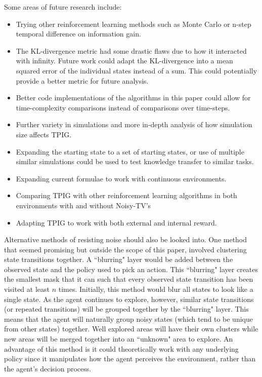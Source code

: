 \documentclass[12pt]{thesis}
\begin{document}
Some areas of future research include:
\begin{itemize}
	\item Trying other reinforcement learning methods such as Monte Carlo or n-step temporal difference on information gain.
	\item The KL-divergence metric had some drastic flaws due to how it interacted with infinity. Future work could adapt the KL-divergence into a mean squared error of the individual states instead of a sum. This could potentially provide a better metric for future analysis.
	\item Better code implementations of the algorithms in this paper could allow for time-complexity comparisons instead of comparisons over time-steps.
	\item Further variety in simulations and more in-depth analysis of how simulation size affects TPIG.
	\item Expanding the starting state to a set of starting states, or use of multiple similar simulations could be used to test knowledge transfer to similar tasks.
	\item Expanding current formulae to work with continuous environments.
	\item Comparing TPIG with other reinforcement learning algorithms in both environments with and without Noisy-TV's
	\item Adapting TPIG to work with both external and internal reward.
\end{itemize}

Alternative methods of resisting noise should also be looked into. One method that seemed promising but outside the scope of this paper, involved clustering state transitions together. A ``blurring" layer would be added between the observed state and the policy used to pick an action. This ``blurring" layer creates the smallest mask that it can such that every observed state transition has been visited at least $n$ times. Initially, this method would blur all states to look like a single state. As the agent continues to explore, however, similar state transitions (or repeated transitions) will be grouped together by the ``blurring" layer. This means that the agent will naturally group noisy states (which tend to be unique from other states) together. Well explored areas will have their own clusters while new areas will be merged together into an ``unknown" area to explore. An advantage of this method is it could theoretically work with any underlying policy since it manipulates how the agent perceives the environment, rather than the agent's decision process.
\end{document}
